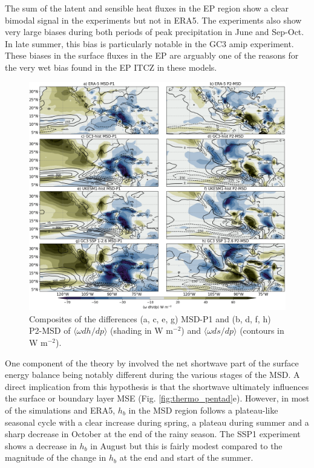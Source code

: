  The sum of the latent and sensible heat fluxes in the EP region show a clear bimodal signal in the experiments but not in ERA5. The experiments also show very large biases during both periods of peak precipitation in June and Sep-Oct. In late summer, this bias is particularly notable in the GC3 amip experiment. These biases in the surface fluxes in the EP are arguably one of the reasons for the very wet bias found in the EP ITCZ in these models. 
 
\begin{figure}[t!]
\includegraphics[width=\linewidth]{figures/thermocompositewdhdpanom.png}
\caption[Composites of the anomalous vertical advection of the MSE budget]{Composites of the differences (a, c, e, g) MSD-P1 and (b, d, f, h) P2-MSD of $\langle \omega dh/dp \rangle$ (shading in W m$^{-2}$) and $\langle \omega ds/dp \rangle$ (contours in W m$^{-2}$).  }
\label{fig:wdhdpanom}
\end{figure} 
 

One component of the theory by \cite{karnauskas2013} involved the net shortwave part of the surface energy balance being notably different during the various stages of the MSD. A direct implication from this hypothesis is that the shortwave ultimately influences the surface or boundary layer MSE (Fig. \ref{fig:thermo_pentad}e). However, in most of the simulations and ERA5, $h_b$ in the MSD region follows a plateau-like seasonal cycle with a clear increase during spring, a plateau during summer and a sharp decrease in October at the end of the rainy season. The SSP1 experiment shows a  decrease in $h_b$ in August but this is fairly modest compared to the magnitude of the change in $h_b$ at the end and start of the summer. 

